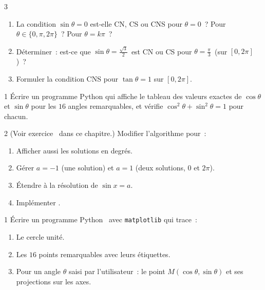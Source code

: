 \begin{exo}{3}
\begin{enumerate}
  \item La condition $\sin\theta=0$ est-elle CN, CS ou CNS pour $\theta=0$~?
        Pour $\theta\in\{0,\pi,2\pi\}$~? Pour $\theta=k\pi$~?
  \item D\'eterminer~: est-ce que \og $\sin\theta=\frac{\sqrt{3}}{2}$\fg\ est CN ou CS
        pour \og $\theta=\frac{\pi}{3}$\fg\ (sur $[0,2\pi]$)~?
  \item Formuler la condition CNS pour $\tan\theta=1$ sur $[0,2\pi]$.
\end{enumerate}
\end{exo}

\begin{exo}{1}
\'Ecrire un programme Python qui affiche le tableau des valeurs exactes
de $\cos\theta$ et $\sin\theta$ pour les $16$ angles remarquables,
et v\'erifie $\cos^2\theta+\sin^2\theta=1$ pour chacun.
\end{exo}

\begin{exo}[\algo\ Algorithme~: r\'esoudre $\cos x=a$ sur {$[0,2\pi]$} \corrige]{2}
(Voir exercice \logicoalgo\ dans ce chapitre.)
Modifier l'algorithme pour~:
\begin{enumerate}
  \item Afficher aussi les solutions en degr\'es.
  \item G\'erer $a=-1$ (une solution) et $a=1$ (deux solutions, $0$ et $2\pi$).
  \item \'Etendre \`a la r\'esolution de $\sin x=a$.
  \item Impl\'ementer \computer.
\end{enumerate}
\end{exo}

\begin{exo}{1}
\'Ecrire un programme Python \computer\ avec \texttt{matplotlib} qui trace~:
\begin{enumerate}
  \item Le cercle unit\'e.
  \item Les $16$ points remarquables avec leurs \'etiquettes.
  \item Pour un angle $\theta$ saisi par l'utilisateur~:
        le point $M(\cos\theta,\sin\theta)$ et ses projections sur les axes.
\end{enumerate}
\end{exo}

